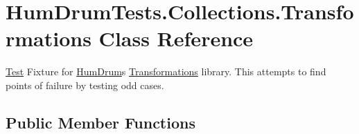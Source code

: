 \hypertarget{classHumDrumTests_1_1Collections_1_1Transformations}{}\section{Hum\+Drum\+Tests.\+Collections.\+Transformations Class Reference}
\label{classHumDrumTests_1_1Collections_1_1Transformations}


\hyperlink{classHumDrumTests_1_1Test}{Test} Fixture for \hyperlink{namespaceHumDrum}{Hum\+Drum}\textquotesingle{}s \hyperlink{classHumDrumTests_1_1Collections_1_1Transformations}{Transformations} library. This attempts to find points of failure by testing odd cases.  


\subsection*{Public Member Functions}
